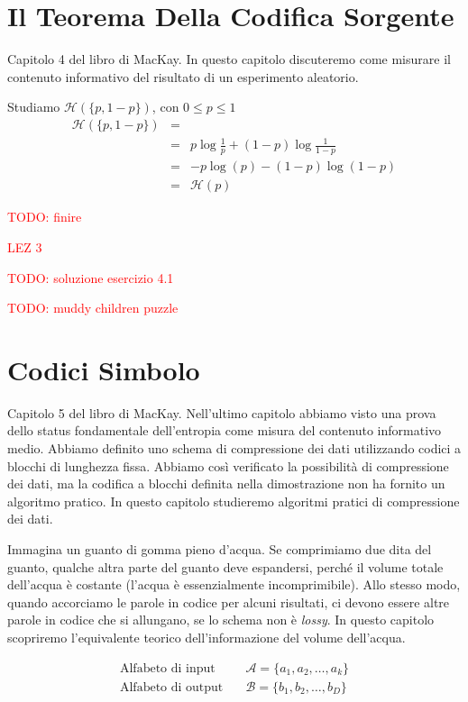 \section{Il Teorema Della Codifica Sorgente}
Capitolo 4 del libro di MacKay. In questo capitolo discuteremo come misurare il contenuto informativo del risultato di un esperimento aleatorio.\bigskip

\noindent Studiamo $\mathcal{H}(\{p,1-p\})$, con $0\leq p\leq 1$
\begin{eqnarray*}
    \mathcal{H}(\{p,1-p\})  & = &\\
                            & = & p\log\frac{1}{p} + (1-p)\log\frac{1}{1-p}\\
                            & = & -p\log(p) - (1-p)\log(1-p)\\
                            & = & \mathcal{H}(p)
\end{eqnarray*}

\textcolor{Red}{TODO: finire}


\textcolor{Red}{LEZ 3}

\textcolor{Red}{TODO: soluzione esercizio 4.1}

\textcolor{Red}{TODO: muddy children puzzle}



\section{Codici Simbolo}
Capitolo 5 del libro di MacKay. Nell'ultimo capitolo abbiamo visto una prova dello status fondamentale dell'entropia come misura del contenuto informativo medio. Abbiamo definito uno schema di compressione dei dati utilizzando codici a blocchi di lunghezza fissa. Abbiamo così verificato la possibilità di compressione dei dati, ma la codifica a blocchi definita nella dimostrazione non ha fornito un algoritmo pratico. In questo capitolo studieremo algoritmi pratici di compressione dei dati.

Immagina un guanto di gomma pieno d'acqua. Se comprimiamo due dita del guanto, qualche altra parte del guanto deve espandersi, perché il volume totale dell'acqua è costante (l'acqua è essenzialmente incomprimibile). Allo stesso modo, quando accorciamo le parole in codice per alcuni risultati, ci devono essere altre parole in codice che si allungano, se lo schema non è \emph{lossy}. In questo capitolo scopriremo l'equivalente teorico dell'informazione del volume dell'acqua.

\begin{definition}
    \begin{align*}
        \text{Alfabeto di input} \quad &\mathcal{A}=\{a_1,a_2,\dots,a_k\}\\
        \text{Alfabeto di output} \quad &\mathcal{B}=\{b_1,b_2,\dots,b_D\}\\
    \end{align*}
\end{definition}

